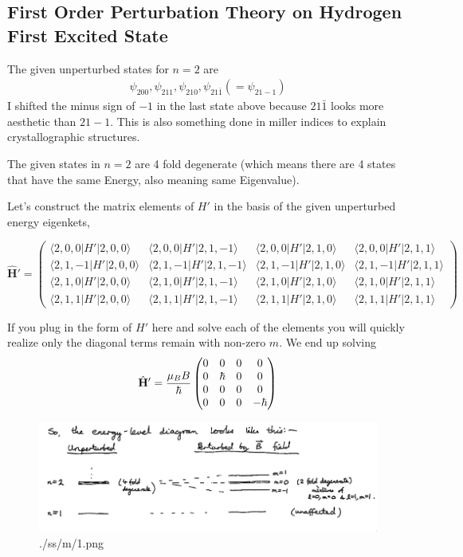 \documentclass[10pt]{article}
\renewcommand{\vec}{\mathbf}
\begin{document}
\subsection*{First Order Perturbation Theory on Hydrogen First Excited State}
The given unperturbed states for $n = 2$ are 
\begin{align*}
	\psi_{200}, \psi_{211}, \psi_{210}, \psi_{21 \bar{1}}  (= \psi_{21-1} )
\end{align*}
I shifted the minus sign of $-1$ in the last state above because $21 \bar{1}$ looks more aesthetic than $21-1$. This is also something done in miller indices to explain crystallographic structures.

The given states in $n=2$ are 4 fold degenerate (which means there are 4 states that have the same Energy, also meaning same Eigenvalue). 

Let's construct the matrix elements of $H'$ in the basis of the given unperturbed energy eigenkets, 

\[
	\hat{\vec{H}}' = 
\begin{pmatrix}
\langle 2, 0, 0 | H' | 2, 0, 0 \rangle & \langle 2, 0, 0 | H' | 2, 1, -1 \rangle & \langle 2, 0, 0 | H' | 2, 1, 0 \rangle & \langle 2, 0, 0 | H' | 2, 1, 1 \rangle \\
\langle 2, 1, -1 | H' | 2, 0, 0 \rangle & \langle 2, 1, -1 | H' | 2, 1, -1 \rangle & \langle 2, 1, -1 | H' | 2, 1, 0 \rangle & \langle 2, 1, -1 | H' | 2, 1, 1 \rangle \\
\langle 2, 1, 0 | H' | 2, 0, 0 \rangle & \langle 2, 1, 0 | H' | 2, 1, -1 \rangle & \langle 2, 1, 0 | H' | 2, 1, 0 \rangle & \langle 2, 1, 0 | H' | 2, 1, 1 \rangle \\
\langle 2, 1, 1 | H' | 2, 0, 0 \rangle & \langle 2, 1, 1 | H' | 2, 1, -1 \rangle & \langle 2, 1, 1 | H' | 2, 1, 0 \rangle & \langle 2, 1, 1 | H' | 2, 1, 1 \rangle
\end{pmatrix}
\] 

If you plug in the form of $H'$ here and solve each of the elements you will quickly realize only the diagonal terms remain with non-zero $m$. We end up solving 
\[
\hat{\vec{H}} ' = \frac{\mu_B B}{\hb} 
\begin{pmatrix} 0 & 0 & 0 & 0 \\ 
0 & \hb & 0 & 0 \\
0 & 0 & 0 & 0 \\ 
0& 0 & 0 & - \hb \end{pmatrix} 
\] 
\begin{figure}[H]
	\centering
	\includegraphics[width=1\textwidth]{./ss/m/1.png}
	\caption{./ss/m/1.png}
	\label{fig:-ss-m-1-png}
\end{figure}
\end{document}

